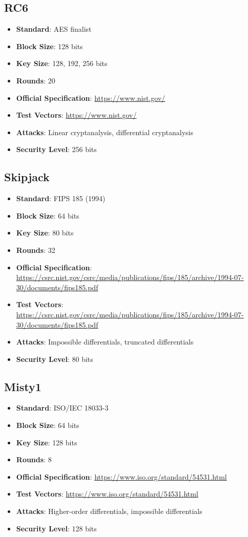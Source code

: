\documentclass[11pt,a4paper]{article}
\begin{document}
\subsection{RC6}
\begin{itemize}
    \item \textbf{Standard}: AES finalist
    \item \textbf{Block Size}: 128 bits
    \item \textbf{Key Size}: 128, 192, 256 bits
    \item \textbf{Rounds}: 20
    \item \textbf{Official Specification}: \url{https://www.nist.gov/}
    \item \textbf{Test Vectors}: \url{https://www.nist.gov/}
    \item \textbf{Attacks}: Linear cryptanalysis, differential cryptanalysis
    \item \textbf{Security Level}: 256 bits
\end{itemize}

\subsection{Skipjack}
\begin{itemize}
    \item \textbf{Standard}: FIPS 185 (1994)
    \item \textbf{Block Size}: 64 bits
    \item \textbf{Key Size}: 80 bits
    \item \textbf{Rounds}: 32
    \item \textbf{Official Specification}: \url{https://csrc.nist.gov/csrc/media/publications/fips/185/archive/1994-07-30/documents/fips185.pdf}
    \item \textbf{Test Vectors}: \url{https://csrc.nist.gov/csrc/media/publications/fips/185/archive/1994-07-30/documents/fips185.pdf}
    \item \textbf{Attacks}: Impossible differentials, truncated differentials
    \item \textbf{Security Level}: 80 bits
\end{itemize}

\subsection{Misty1}
\begin{itemize}
    \item \textbf{Standard}: ISO/IEC 18033-3
    \item \textbf{Block Size}: 64 bits
    \item \textbf{Key Size}: 128 bits
    \item \textbf{Rounds}: 8
    \item \textbf{Official Specification}: \url{https://www.iso.org/standard/54531.html}
    \item \textbf{Test Vectors}: \url{https://www.iso.org/standard/54531.html}
    \item \textbf{Attacks}: Higher-order differentials, impossible differentials
    \item \textbf{Security Level}: 128 bits
\end{itemize}
\end{document}
